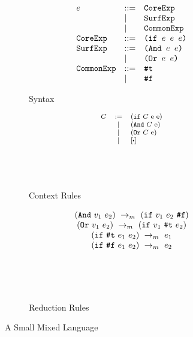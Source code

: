 \begin{figure}[t]
\centering
\begin{subfigure}{0.3\linewidth}{\footnotesize
    \begin{flushleft}
        \[
        \begin{array}{lll}
        e &::=& \mbox{\tt CoreExp} \\
        &|&\mbox{\tt SurfExp}\\
        &|&\mbox{\tt CommonExp}\\
        \mbox{\tt CoreExp} &::=& \texttt{(if~$e$~$e$~$e$)}\\
        \mbox{\tt SurfExp} &::=& \texttt{(And~$e$~$e$)}\\
        &|&\texttt{(Or~$e$~$e$)}\\
        \mbox{\tt CommonExp} &::=& \mbox{\tt \#t}\\
        &|& \mbox{\tt \#f}\\
        \end{array}
        \]
    \end{flushleft}
    \caption{Syntax}
    \label{fig:mixsyntax}
}
\end{subfigure}
\begin{subfigure}{0.2\linewidth}{\footnotesize
    \begin{flushleft}
        \[\footnotesize
        \begin{array}{lcl}
        C &:=& (\m{if}~C~$e$~$e$)\\
        &|& (\m{And}~C~$e$)\\
        &|& (\m{Or}~C~$e$)\\
        &|&[\bigcdot]\\[5em]
        \end{array}
        \]
        \end{flushleft}
    \caption{Context Rules}
    \label{fig:mixcontext}
}
\end{subfigure}
\begin{subfigure}{0.3\linewidth}{\footnotesize
    \begin{flushleft}
        \[
        \begin{array}{c}
        (\mbox{\tt And}~v_1~e_2) ~\rightarrow_m~(\mbox{\tt if}~v_1~e_2~\mbox{\tt \#f})\\
        (\mbox{\tt Or}~v_1~e_2) ~\rightarrow_m~(\mbox{\tt if}~v_1~\mbox{\tt \#t}~e_2)\\
        (\mbox{\tt if}~\mbox{\tt \#t}~e_1~e_2) ~\rightarrow_m~e_1\\
        (\mbox{\tt if}~\mbox{\tt \#f}~e_1~e_2) ~\rightarrow_m~e_2\\[5em]
        \end{array}
        \]
    \end{flushleft}
    \caption{Reduction Rules}
    \label{fig:mixreduction}
}
\end{subfigure}

\caption{A Small Mixed Language}
\label{fig:mixexample}
\end{figure}


